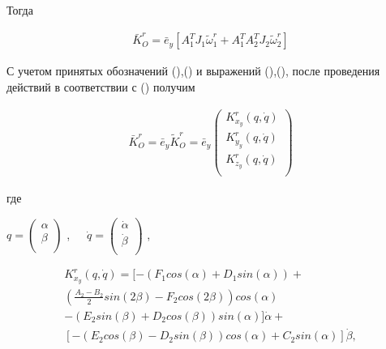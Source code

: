 Тогда\par

\begin{equation}
\label{eq:p3:14}
\begin{alignedat}{2}
\bar{K}_{O}^{r}=\bar{e}_{y} [ 
	A_{1}^{T}J_{1} \tilde{\omega}_{1}^{r} + A_{1}^{T} A_{2}^{T} J_{2} \tilde{\omega}_{2}^{r} 
] 
\end{alignedat}
\end{equation}

С учетом принятых обозначений (),() и выражений (),(), после проведения действий в соответствии с () получим\par

\begin{equation}
\label{eq:p3:15}
\begin{alignedat}{2}
\bar{K}_{O}^{r}=\bar{e}_{y}\tilde{K}_{O}^{r}=\bar{e}_{y} \left( \begin{matrix}
K_{x_{y}}^{r} \left( q,\dot{q} \right) \\
K_{y_{y}}^{r} \left( q,\dot{q} \right) \\
K_{z_{y}}^{r} \left( q,\dot{q} \right) \\
\end{matrix}
\right) 
\end{alignedat}
\end{equation}

где \par

\( q= \left( \begin{matrix}
\alpha \\
\beta \\
\end{matrix}
\right)  \) ,\ \ \   \( \dot{q}= \left( \begin{matrix}
\dot{\alpha} \\
\dot{\beta} \\
\end{matrix}
\right)  \) , \par
\begin{equation}
\begin{multlined}
K_{x_{y}}^{r} ( q,\dot{q} ) = 
[
	-( 
		F_{1}cos (  \alpha  ) +
		D_{1}sin (  \alpha  )  
	) +   \nonumber \\
	( 
		\frac{A_{2}-B_{2}}{2}sin ( 2 \beta  ) -
		F_{2}cos ( 2 \beta  )  
	) cos (  \alpha  ) \nonumber \\
	- ( 
		E_{2}sin (  \beta  ) +
		D_{2}cos (  \beta  )  
	) sin (  \alpha  )  
] \dot{\alpha} + \nonumber \\
[
	- ( 
		E_{2}cos (  \beta  ) -
		D_{2}sin (  \beta  )  
	) cos (  \alpha  ) +
	C_{2}sin (  \alpha  )  
]  \dot{\beta}	,\nonumber
\end{multlined}
\end{equation}

